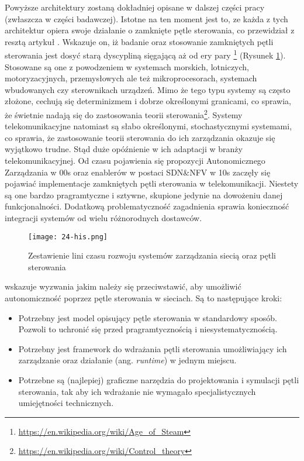 Powyższe architektury zostaną dokładniej opisane w dalszej części pracy (zwłaszcza w części badawczej). Istotne na ten moment jest to, ze każda z tych architektur opiera swoje działanie o zamknięte pętle sterowania, co przewidział z resztą artykuł \cite{fallon2019}. Wskazuje on, iż badanie oraz stosowanie zamkniętych pętli sterowania jest dosyć starą dyscypliną sięgającą aż od ery pary \footnote{\url{https://en.wikipedia.org/wiki/Age_of_Steam}} (Rysunek \ref{fig:24-his}). Stosowane są one z powodzeniem w systemach morskich, lotniczych, motoryzacyjnych, przemysłowych ale też mikroprocesorach, systemach wbudowanych czy sterownikach urządzeń. Mimo że tego typu systemy są często złożone, cechują się determinizmem i dobrze określonymi granicami, co sprawia, że świetnie nadają się do zastosowania teorii sterowania\footnote{\url{https://en.wikipedia.org/wiki/Control_theory}}. Systemy telekomunikacyjne natomiast są słabo określonymi, stochastycznymi systemami, co sprawia, że zastosowanie teorii sterowania do ich zarządzania okazuje się wyjątkowo trudne. Stąd duże opóźnienie w ich adaptacji w branży telekomunikacyjnej. Od czasu pojawienia się propozycji Autonomicznego Zarządzania \cite{kephart2003} w 00s oraz enablerów w postaci SDN\&NFV w 10s zaczęły się pojawiać implementacje zamkniętych pętli sterowania w telekomunikacji. Niestety są one bardzo pragramtyczne i sztywne, skupione jedynie na dowożeniu danej funkcjonalności. Dodatkową problematyczność zagadnienia sprawia konieczność integracji systemów od wielu różnorodnych dostawców.

\begin{figure}[!htbp]
    \centering \texttt{[image: 24-his.png]}
    \caption{Zestawienie lini czasu rozwoju systemów zarządzania siecią oraz pętli sterowania}\label{fig:24-his}
\end{figure}

\cite{fallon2019} wskazuje wyzwania jakim należy się przeciwstawić, aby umożliwić autonomiczność poprzez pętle sterowania w sieciach. Są to następujące kroki:
\begin{itemize}\hypertarget{list:1}{}
    \item Potrzebny jest model opisujący pętle sterowania w standardowy sposób. Pozwoli to uchronić się przed pragramtycznością i niesystematycznością.
    \item Potrzebny jest framework do wdrażania pętli sterowania umożliwiający ich zarządzanie oraz działanie (ang. \textit{runtime}) w jednym miejscu.
    \item Potrzebne są (najlepiej) graficzne narzędzia do projektowania i symulacji pętli sterowania, tak aby ich wdrażanie nie wymagało specjalistycznych umiejętności technicznych.
\end{itemize}

